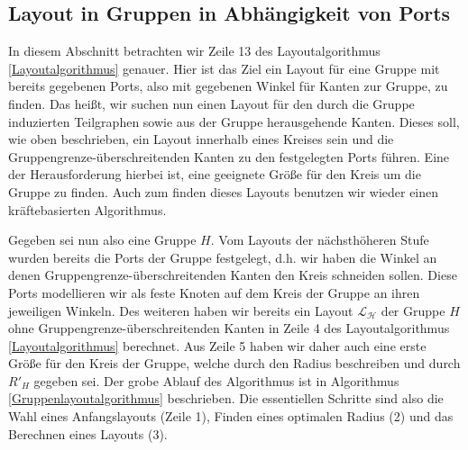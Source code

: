
\subsection{Layout in Gruppen in Abhängigkeit von Ports}

In diesem Abschnitt betrachten wir Zeile 13 des Layoutalgorithmus \ref{Layoutalgorithmus} genauer. 
Hier ist das Ziel ein Layout für eine Gruppe mit bereits gegebenen Ports, also mit gegebenen Winkel für Kanten zur Gruppe, zu finden.
Das heißt, wir suchen nun einen Layout für den durch die Gruppe induzierten Teilgraphen sowie aus der Gruppe herausgehende Kanten.
Dieses soll, wie oben beschrieben, ein Layout innerhalb eines Kreises sein und die Gruppengrenze-überschreitenden Kanten zu den festgelegten Ports führen.
Eine der Herausforderung hierbei ist, eine geeignete Größe für den Kreis um die Gruppe zu finden. Auch zum finden dieses Layouts benutzen wir wieder einen kräftebasierten Algorithmus.


Gegeben sei nun also eine Gruppe $H$. Vom Layouts der nächsthöheren Stufe wurden bereits die Ports der Gruppe festgelegt, d.h. wir haben die Winkel an denen Gruppengrenze-überschreitenden Kanten den Kreis schneiden sollen. Diese Ports modellieren wir als feste Knoten auf dem Kreis der Gruppe an ihren jeweiligen Winkeln.
Des weiteren haben wir bereits ein Layout $\mathcal{L_H}$ der Gruppe $H$ ohne Gruppengrenze-überschreitenden Kanten in Zeile 4 des Layoutalgorithmus \ref{Layoutalgorithmus}  berechnet.
Aus Zeile 5 haben wir daher auch eine erste Größe für den Kreis der Gruppe, welche durch den Radius beschreiben und durch $R'_H$ gegeben sei. 
Der grobe Ablauf des Algorithmus ist in Algorithmus \ref{Gruppenlayoutalgorithmus} beschrieben. Die essentiellen Schritte sind also die Wahl eines Anfangslayouts (Zeile 1), Finden eines optimalen Radius (2) und das Berechnen eines Layouts (3).

